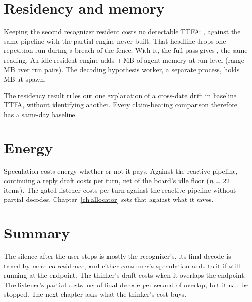 \section{Residency and memory}
\label{sec:residency}

Keeping the second recognizer resident costs no detectable TTFA: \ResidencyTTFA,
against the same pipeline with the partial engine never built. That headline
drops one repetition run during a breach of the fence. With it, the full pass
gives \ResidencyFull, the same reading. An idle resident engine adds +\ResidencyMem\,MB of agent memory at
run level (range \ResidencyMemRange\,MB over run pairs). The decoding
hypothesis worker, a separate process, holds \WorkerPSS\,MB at spawn.

The residency result rules out one explanation of a cross-date drift in
baseline TTFA, without identifying another. Every claim-bearing comparison
therefore has a same-day baseline.

\section{Energy}
\label{sec:energy-cost}

Speculation costs energy whether or not it pays. Against the reactive
pipeline, continuing a reply draft costs \SpecEnergyr{} per turn, net of the
board's idle floor ($n=22$ items). The gated listener costs
\EnergyListenerr{} per turn against the reactive pipeline without partial
decodes. Chapter~\ref{ch:allocator} sets that against what it saves.

\section{Summary}

The silence after the user stops is mostly the recognizer's. Its final decode
is taxed by mere co-residence, and either consumer's speculation adds to it if
still running at the endpoint. The thinker's draft costs \ThinkerOverlap{}
when it overlaps the endpoint. The listener's partial costs \ListenerC\,ms of
final decode per second of overlap, but it can be stopped. The next chapter asks
what the thinker's cost buys.
